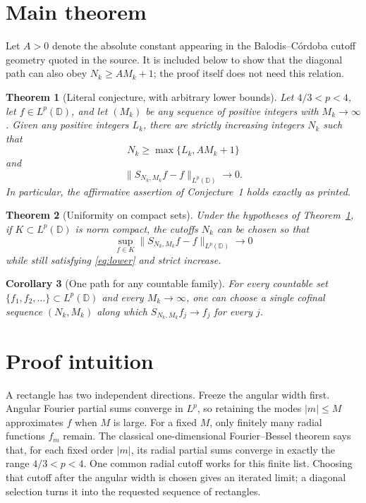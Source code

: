 \documentclass[11pt]{article}
\newtheorem{theorem}{Theorem}
\newtheorem{corollary}[theorem]{Corollary}
\newcommand{\D}{\mathbb D}
\begin{document}
\section{Main theorem}

Let $A>0$ denote the absolute constant appearing in the Balodis--C\'ordoba
cutoff geometry quoted in the source.  It is included below to show that the
diagonal path can also obey $N_k\ge AM_k+1$; the proof itself does not need
this relation.

\begin{theorem}[Literal conjecture, with arbitrary lower bounds]\label{thm:main}
Let $4/3<p<4$, let $f\in L^p(\D)$, and let $(M_k)$ be any sequence of
positive integers with $M_k\to\infty$.  Given any positive integers $L_k$,
there are strictly increasing integers $N_k$ such that
\begin{equation}\label{eq:lower}
 N_k\ge\max\{L_k,AM_k+1\}
\end{equation}
and
\begin{equation}\label{eq:conv}
 \|S_{N_k,M_k}f-f\|_{L^p(\D)}\longrightarrow0.
\end{equation}
In particular, the affirmative assertion of Conjecture~1 holds exactly as
printed.
\end{theorem}

\begin{theorem}[Uniformity on compact sets]\label{thm:compact}
Under the hypotheses of Theorem~\ref{thm:main}, if
$K\subset L^p(\D)$ is norm compact, the cutoffs $N_k$ can be chosen so that
\[
 \sup_{f\in K}\|S_{N_k,M_k}f-f\|_{L^p(\D)}\longrightarrow0
\]
while still satisfying \eqref{eq:lower} and strict increase.
\end{theorem}

\begin{corollary}[One path for any countable family]\label{cor:countable}
For every countable set $\{f_1,f_2,\ldots\}\subset L^p(\D)$ and every
$M_k\to\infty$, one can choose a single cofinal sequence $(N_k,M_k)$ along
which $S_{N_k,M_k}f_j\to f_j$ for every $j$.
\end{corollary}

\section{Proof intuition}

A rectangle has two independent directions.  Freeze the angular width first.
Angular Fourier partial sums converge in $L^p$, so retaining the modes
$|m|\le M$ approximates $f$ when $M$ is large.  For a fixed $M$, only
finitely many radial functions $f_m$ remain.  The classical one-dimensional
Fourier--Bessel theorem says that, for each fixed order $|m|$, its radial
partial sums converge in exactly the range $4/3<p<4$.  One common radial
cutoff works for this finite list.  Choosing that cutoff after the angular
width is chosen gives an iterated limit; a diagonal selection turns it into
the requested sequence of rectangles.
\end{document}

